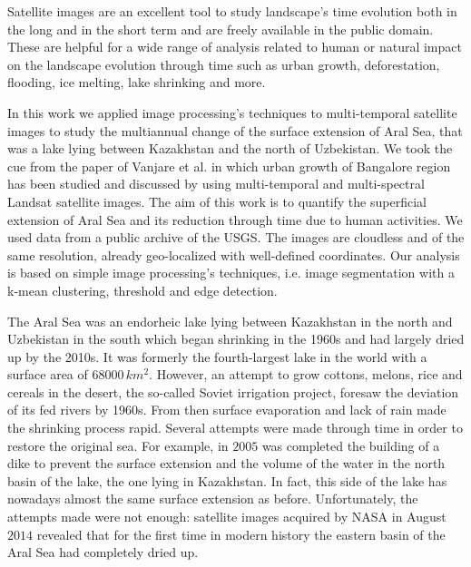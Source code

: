 Satellite images are an excellent tool to study landscape's time evolution both in the long and in the short term and are freely available in the public domain. 
These are helpful for a wide range of analysis related to human or natural impact on the landscape evolution through time such as urban growth, deforestation, flooding, ice melting, lake shrinking and more.

In this work we applied image processing's techniques to multi-temporal satellite images to study the multiannual change of the surface extension of Aral Sea, that was a lake lying between Kazakhstan and the north of Uzbekistan. 
We took the cue from the paper of Vanjare et al. \cite{satelliteImg} in which urban growth of Bangalore region has been studied and discussed by using multi-temporal and multi-spectral Landsat satellite images. 
The aim of this work is to quantify the superficial extension of Aral Sea and its reduction through time due to human activities.
We used data from a public archive of the USGS. 
The images are cloudless and of the same resolution, already geo-localized with well-defined coordinates. 
Our analysis is based on simple image processing's techniques, i.e. image segmentation with a k-mean clustering, threshold and edge detection.

The Aral Sea was an endorheic lake lying between Kazakhstan in the north and Uzbekistan in the south which began shrinking in the 1960s and had largely dried up by the 2010s. 
It was formerly the fourth-largest lake in the world with a surface area of $68000\,km^2$.  
However, an attempt to grow cottons, melons, rice and cereals in the desert, the so-called Soviet irrigation project, foresaw the deviation of its fed rivers by 1960s. 
From then surface evaporation and lack of rain made the shrinking process rapid. Several attempts were made through time in order to restore the original sea.
For example, in $2005$ was completed the building of a dike to prevent the surface extension and the volume of the water in the north basin of the lake, the one lying in Kazakhstan. 
In fact, this side of the lake has nowadays almost the same surface extension as before. 
Unfortunately, the attempts made were not enough: satellite images acquired by NASA in August $2014$ revealed that for the first time in modern history the eastern basin of the Aral Sea had completely dried up.
